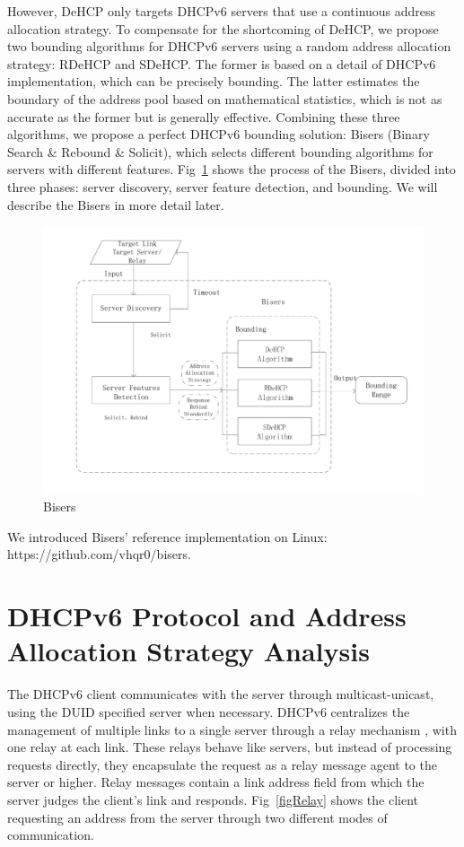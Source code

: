 \documentclass[conference]{IEEEtran}
\begin{document}
However, DeHCP only targets DHCPv6 servers that use a continuous
address allocation strategy. To compensate for the shortcoming of
DeHCP, we propose two bounding algorithms for DHCPv6 servers using a
random address allocation strategy: RDeHCP and SDeHCP. The former is
based on a detail of DHCPv6 implementation, which can be precisely
bounding. The latter estimates the boundary of the address pool based
on mathematical statistics, which is not as accurate as the former but
is generally effective. Combining these three algorithms, we propose a
perfect DHCPv6 bounding solution: Bisers (Binary Search \& Rebound \&
Solicit), which selects different bounding algorithms for servers with
different features. Fig~\ref{figBisers} shows the process of the
Bisers, divided into three phases: server discovery, server feature
detection, and bounding. We will describe the Bisers in more detail
later.

\begin{figure}[htbp]
  \centerline{\includegraphics[scale=0.4]{bisers.pdf}}
  \caption{Bisers}
  \label{figBisers}
\end{figure}

We introduced Bisers' reference implementation on Linux:
https://github.com/vhqr0/bisers.

\section{DHCPv6 Protocol and Address Allocation Strategy Analysis}

The DHCPv6 client communicates with the server through
multicast-unicast, using the DUID specified server when
necessary. DHCPv6 centralizes the management of multiple links to a
single server through a relay mechanism \cite{carney_dynamic_2003}
\cite{mrugalski_dynamic_2018}, with one relay at each link. These
relays behave like servers, but instead of processing requests
directly, they encapsulate the request as a relay message agent to the
server or higher. Relay messages contain a link address field from
which the server judges the client's link and
responds. Fig~\ref{figRelay} shows the client requesting an address
from the server through two different modes of communication.
\end{document}
